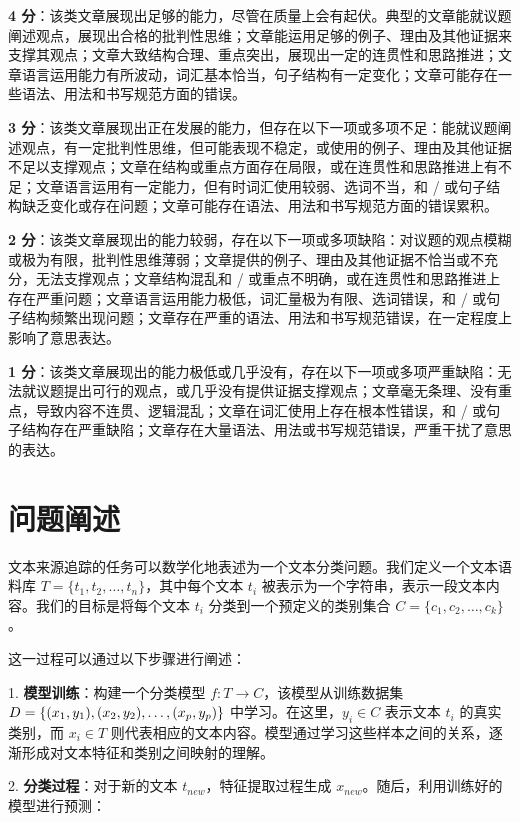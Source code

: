 \textbf{4 分}：该类文章展现出足够的能力，尽管在质量上会有起伏。典型的文章能就议题阐述观点，展现出合格的批判性思维；文章能运用足够的例子、理由及其他证据来支撑其观点；文章大致结构合理、重点突出，展现出一定的连贯性和思路推进；文章语言运用能力有所波动，词汇基本恰当，句子结构有一定变化；文章可能存在一些语法、用法和书写规范方面的错误。

\textbf{3 分}：该类文章展现出正在发展的能力，但存在以下一项或多项不足：能就议题阐述观点，有一定批判性思维，但可能表现不稳定，或使用的例子、理由及其他证据不足以支撑观点；文章在结构或重点方面存在局限，或在连贯性和思路推进上有不足；文章语言运用有一定能力，但有时词汇使用较弱、选词不当，和 / 或句子结构缺乏变化或存在问题；文章可能存在语法、用法和书写规范方面的错误累积。

\textbf{2 分}：该类文章展现出的能力较弱，存在以下一项或多项缺陷：对议题的观点模糊或极为有限，批判性思维薄弱；文章提供的例子、理由及其他证据不恰当或不充分，无法支撑观点；文章结构混乱和 / 或重点不明确，或在连贯性和思路推进上存在严重问题；文章语言运用能力极低，词汇量极为有限、选词错误，和 / 或句子结构频繁出现问题；文章存在严重的语法、用法和书写规范错误，在一定程度上影响了意思表达。

\textbf{1 分}：该类文章展现出的能力极低或几乎没有，存在以下一项或多项严重缺陷：无法就议题提出可行的观点，或几乎没有提供证据支撑观点；文章毫无条理、没有重点，导致内容不连贯、逻辑混乱；文章在词汇使用上存在根本性错误，和 / 或句子结构存在严重缺陷；文章存在大量语法、用法或书写规范错误，严重干扰了意思的表达。

\section{问题阐述}
\label{sec:TOSWT-task}

文本来源追踪的任务可以数学化地表述为一个文本分类问题。我们定义一个文本语料库 \( T = \{t_1, t_2, \ldots, t_n\} \)，其中每个文本 \( t_i \) 被表示为一个字符串，表示一段文本内容。我们的目标是将每个文本 \( t_i \) 分类到一个预定义的类别集合 \( C = \{c_1, c_2, \ldots, c_k\} \)。

这一过程可以通过以下步骤进行阐述：

1. \textbf{模型训练}：构建一个分类模型 \( f: T \to C \)，该模型从训练数据集 $ D = \{(x_1, y_1),\\ (x_2, y_2), \ldots, (x_p, y_p)\} $ 中学习。在这里，\( y_i \in C \) 表示文本 \( t_i \) 的真实类别，而 \( x_i \in T \) 则代表相应的文本内容。模型通过学习这些样本之间的关系，逐渐形成对文本特征和类别之间映射的理解。

2. \textbf{分类过程}：对于新的文本 \( t_{new} \)，特征提取过程生成 \( x_{new} \)。随后，利用训练好的模型进行预测：


